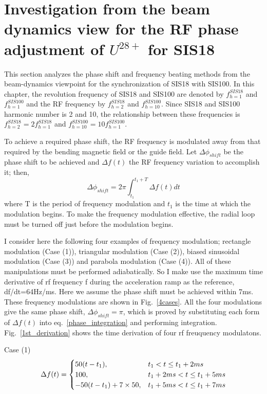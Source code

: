 \section{Investigation from the beam dynamics view for the RF phase adjustment of $U^{28+}$ for SIS18}
This section analyzes the phase shift and frequency beating methods from the beam-dynamics viewpoint for the synchronization of SIS18 with SIS100. In this chapter, the revolution frequency of SIS18 and SIS100 are denoted by $f_{h=1}^{SIS18}$ and $f_{h=1}^{SIS100}$ and the RF frequency by $f_{h=2}^{SIS18}$ and $f_{h=10}^{SIS100}$. Since SIS18 and SIS100 harmonic number is 2 and 10, the relationship between these frequencies is $f_{h=2}^{SIS18}=2f_{h=1}^{SIS18}$ and $f_{h=10}^{SIS100}=10f_{h=1}^{SIS100}$.

To achieve a required phase shift, the RF frequency is modulated away from that required by the bending magnetic field or the guide field. Let $\Delta \phi_{shift}$ be the phase shift to be achieved and $\Delta f(t)$ the RF frequency variation to accomplish it; then,
\begin{equation}
\Delta \phi_{shift}= 2\pi \int_{t_1}^{t_1+T} \Delta f(t)dt \label{phase_integration}
\end{equation}
where T is the period of frequency modulation and $t_1$ is the time at which the modulation begins. To make the frequency modulation effective, the radial loop must be turned off just before the modulation begins. 

I consider here the following four examples of frequency modulation; rectangle modulation (Case (1)), triangular modulation (Case (2)), biased sinusoidal modulation (Case (3)) and parabola modulation (Case (4)). All of these manipulations must be performed adiabatically. So I make use the maximum time derivative of rf frequency f during the acceleration ramp as the reference, df/dt=64Hz/ms. Here we assume the phase shift must be achieved within 7ms. These frequency modulations are shown in Fig.~\ref{4cases}. All the four modulations give the same phase shift, $\Delta \phi_{shift}=\pi$, which is
proved by substituting each form of $\Delta f(t)$ into eq.~\ref{phase_integration} and performing integration. Fig.~\ref{1st_derivation} shows the time derivation of four rf freuquency modulatons.

Case (1)
\begin{eqnarray}\label{case1}
\Delta f(t)=
\begin{cases}
50(t-t_1), &t_1< t\le t_1+2ms\cr
100, &t_1+2ms < t \le t_1+5ms \cr
-50(t-t_1) + 7\times 50, &t_1+5ms < t\le t_1+7ms
\end{cases}
\end{eqnarray}

